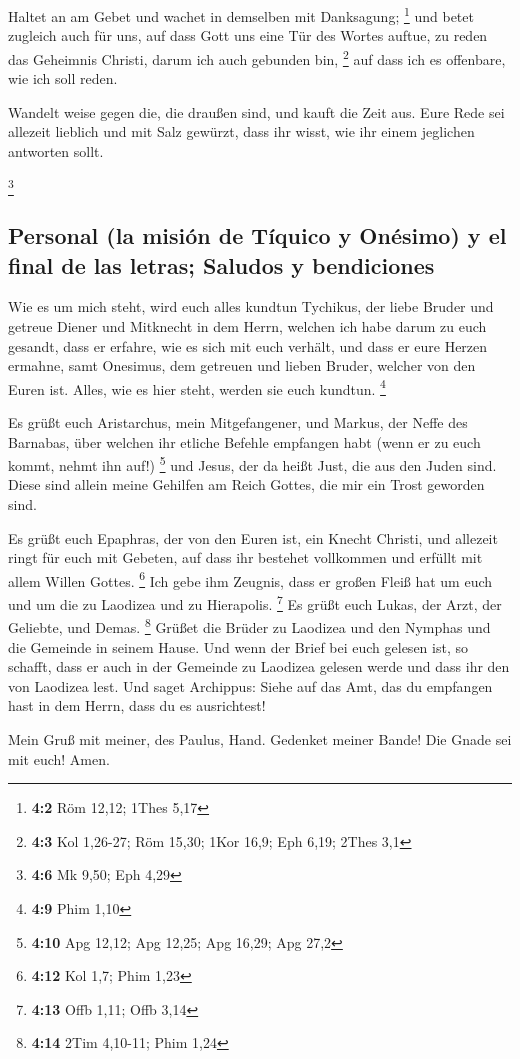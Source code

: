  Haltet an am Gebet und wachet in demselben mit
Danksagung; \footnote{\textbf{4:2} Röm 12,12; 1Thes 5,17} 
und betet zugleich auch für uns, auf dass Gott uns eine Tür des Wortes
auftue, zu reden das Geheimnis Christi, darum ich auch gebunden bin,
\footnote{\textbf{4:3} Kol 1,26-27; Röm 15,30; 1Kor 16,9; Eph 6,19;
  2Thes 3,1}  auf dass ich es offenbare, wie ich soll
reden.

 Wandelt weise gegen die, die draußen sind, und kauft die
Zeit aus.  Eure Rede sei allezeit lieblich und mit Salz
gewürzt, dass ihr wisst, wie ihr einem jeglichen antworten sollt.

\footnote{\textbf{4:6} Mk 9,50; Eph 4,29}

\hypertarget{personal-la-misiuxf3n-de-tuxedquico-y-onuxe9simo-y-el-final-de-las-letras-saludos-y-bendiciones}{%
\subsection{Personal (la misión de Tíquico y Onésimo) y el final de las
letras; Saludos y
bendiciones}\label{personal-la-misiuxf3n-de-tuxedquico-y-onuxe9simo-y-el-final-de-las-letras-saludos-y-bendiciones}}

 Wie es um mich steht, wird euch alles kundtun Tychikus,
der liebe Bruder und getreue Diener und Mitknecht in dem Herrn,
 welchen ich habe darum zu euch gesandt, dass er erfahre,
wie es sich mit euch verhält, und dass er eure Herzen ermahne,
 samt Onesimus, dem getreuen und lieben Bruder, welcher
von den Euren ist. Alles, wie es hier steht, werden sie euch kundtun.
\footnote{\textbf{4:9} Phim 1,10}

 Es grüßt euch Aristarchus, mein Mitgefangener, und
Markus, der Neffe des Barnabas, über welchen ihr etliche Befehle
empfangen habt (wenn er zu euch kommt, nehmt ihn auf!) \footnote{\textbf{4:10}
  Apg 12,12; Apg 12,25; Apg 16,29; Apg 27,2}  und Jesus,
der da heißt Just, die aus den Juden sind. Diese sind allein meine
Gehilfen am Reich Gottes, die mir ein Trost geworden sind.

 Es grüßt euch Epaphras, der von den Euren ist, ein
Knecht Christi, und allezeit ringt für euch mit Gebeten, auf dass ihr
bestehet vollkommen und erfüllt mit allem Willen Gottes. \footnote{\textbf{4:12}
  Kol 1,7; Phim 1,23}  Ich gebe ihm Zeugnis, dass er
großen Fleiß hat um euch und um die zu Laodizea und zu Hierapolis.
\footnote{\textbf{4:13} Offb 1,11; Offb 3,14}  Es grüßt
euch Lukas, der Arzt, der Geliebte, und Demas. \footnote{\textbf{4:14}
  2Tim 4,10-11; Phim 1,24}  Grüßet die Brüder zu Laodizea
und den Nymphas und die Gemeinde in seinem Hause.  Und
wenn der Brief bei euch gelesen ist, so schafft, dass er auch in der
Gemeinde zu Laodizea gelesen werde und dass ihr den von Laodizea lest.
 Und saget Archippus: Siehe auf das Amt, das du empfangen
hast in dem Herrn, dass du es ausrichtest!

 Mein Gruß mit meiner, des Paulus, Hand. Gedenket meiner
Bande! Die Gnade sei mit euch! Amen.
